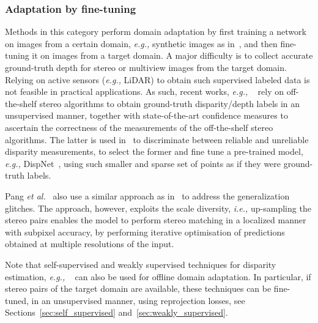 \documentclass[10pt,journal,compsoc]{IEEEtran}
\newcommand{\ie}{\emph{i.e., }}
\newcommand{\eg}{\emph{e.g., }}
\newcommand{\etal}{\emph{et al.}}
\begin{document}
\begin{figure}[t]
\end{figure}

\subsubsection{Adaptation by fine-tuning}
\label{sec:adaptation_finetuning}



Methods in this category perform domain adaptation by first training a network on  images from a certain domain, \eg synthetic images as in~\cite{mayer2016large}, and then fine-tuning it on  images from a target domain. A major difficulty is to collect accurate ground-truth depth for stereo or multiview images  from the target domain.  Relying on  active sensors (\eg LiDAR) to obtain such supervised labeled data is not feasible in practical applications.  As such, recent works, \eg~\cite{tonioni2017unsupervised,tonioni2019unsupervised,pang2018zoom} rely on off-the-shelf stereo algorithms to obtain ground-truth disparity/depth labels in an unsupervised manner, together with state-of-the-art confidence measures  to ascertain the correctness of the measurements of the off-the-shelf stereo algorithms.  The latter is used in~\cite{tonioni2017unsupervised,tonioni2019unsupervised}  to discriminate between reliable and unreliable disparity measurements, to select the former and fine tune a pre-trained  model, \eg DispNet~\cite{mayer2016large}, using such smaller and sparse set of points as if they were ground-truth labels.







Pang \etal~\cite{pang2018zoom} also use a similar  approach as in~\cite{tonioni2017unsupervised,tonioni2019unsupervised} to address the generalization glitches. The approach, however, exploits the scale diversity, \ie up-sampling the stereo pairs enables the model to perform stereo matching in a localized manner with subpixel accuracy, by performing iterative optimisation of predictions obtained at multiple resolutions of the input. 

Note that  self-supervised and weakly supervised techniques for disparity estimation, \eg~\cite{zhou2017weakly,godard2017unsupervised,zhang2018deep,poggi2018towards}  can also be used for offline domain adaptation. In particular, if stereo pairs of the target domain are available, these techniques can be fine-tuned, in an unsupervised manner, using reprojection losses, see Sections~\ref{sec:self_supervised} and~\ref{sec:weakly_supervised}.
\end{document}
